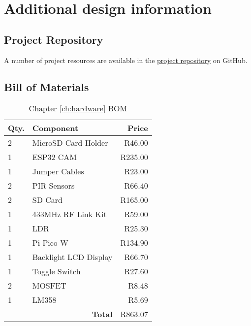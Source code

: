 \documentclass[class=report,11pt,crop=false]{standalone}
\begin{document}
\ifstandalone
\tableofcontents
\fi


\chapter{Additional design information \label{a:A}}

\section{Project Repository}

A number of project resources are available in the \href{https://github.com/rothdu/EEE4113F-Group13-2024}{project repository} on GitHub.

\section{Bill of Materials}


\begin{table}[h]
\centering
\begin{tabular}{|l|l|r|}
\hline
\textbf{Qty.} & \textbf{Component} & \textbf{Price} \\
\hline
2 & MicroSD Card Holder & R46.00 \\
1 & ESP32 CAM & R235.00 \\
1 & Jumper Cables & R23.00 \\
2 & PIR Sensors & R66.40 \\
2 & SD Card & R165.00 \\
1 & 433MHz RF Link Kit & R59.00 \\
1 & LDR & R25.30 \\
1 & Pi Pico W & R134.90 \\
1 & Backlight LCD Display & R66.70 \\
1 & Toggle Switch & R27.60 \\
2 & MOSFET & R8.48 \\
1 & LM358 & R5.69 \\
\hline
\multicolumn{2}{|r|}{\textbf{Total}} & R863.07 \\
\hline
\end{tabular}
\caption{Chapter \ref{ch:hardware} BOM}
\label{tab:HW_BOM}
\end{table}
\end{document}
